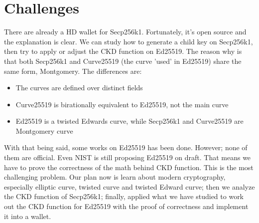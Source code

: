 \chapter{Challenges} \label{chap:Challenges}

There are already a HD wallet for Secp256k1. Fortunately, it's open source and the explanation is clear. We can study how to generate a child key on Secp256k1, then try to apply or adjust the CKD function on Ed25519. The reason why is that both Secp256k1 and Curve25519 (the curve 'used' in Ed25519) share the same form, Montgomery. The differences are:

\begin{itemize}
    \item The curves are defined over distinct fields
    \item Curve25519 is birationally equivalent to Ed25519, not the main curve
    \item Ed25519 is a twisted Edwards curve, while Secp256k1 and Curve25519 are \\ Montgomery curve
\end{itemize}

With that being said, some works on Ed25519 has been done. However; none of them are official. Even NIST is still proposing Ed25519 on draft. That means we have to prove the correctness of the math behind CKD function. This is the most challenging problem. Our plan now is learn about modern cryptography, especially elliptic curve, twisted curve and twisted Edward curve; then we analyze the CKD function of Secp256k1; finally, applied what we have studied to work out the CKD function for Ed25519 with the proof of correctness and implement it into a wallet.